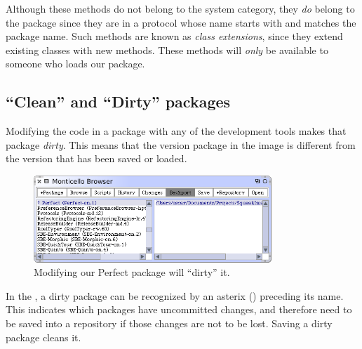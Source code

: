 \documentclass[a4paper,10pt,twoside]{book}
\begin{document}
Although these methods do not belong to the  system category, they \emph{do} belong to the  package since they are in a protocol whose name starts with \ct{*} and matches the package name. Such methods are known as \emph{class extensions}, since they extend existing classes with new methods. These methods will \emph{only} be available to someone who loads our  package.

\subsection{``Clean'' and ``Dirty'' packages}

Modifying the code in a package with any of the development tools makes that package \emph{dirty}.
This means that the version package in the image is different from the version that has been saved or loaded. 

\begin{figure}[ht]\centering
	\includegraphics[width=0.8\textwidth]{dirty}
	\caption{Modifying our Perfect package will ``dirty'' it.}
\end{figure}

In the \MCB,  a dirty package can be recognized by an asterix (\ct{*}) preceding its name.  This indicates which packages have uncommitted changes, and therefore need to be saved into a repository if those changes are not to be lost. Saving a dirty package cleans it.


\end{document}
